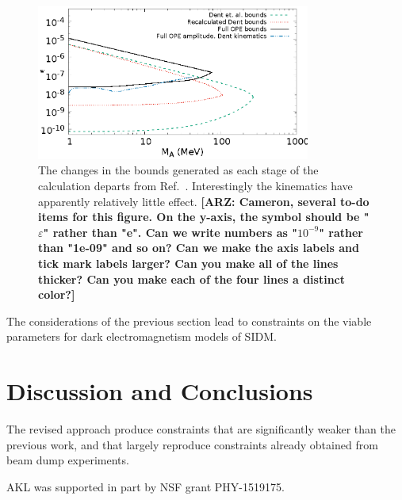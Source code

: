 \documentclass[nofootinbib,prd,superscriptaddress,twocolumn]{revtex4}
\newcommand{\arz}[1]{{{\bf{\color{BrickRed}[ARZ: #1]}}}}
\begin{document}
\begin{figure}[th]
\includegraphics[width=9cm]{stages.eps}
\caption{The changes in the bounds generated as each stage of the calculation departs from Ref.~\cite{dent_etal12}. Interestingly the kinematics have apparently relatively little effect.
\arz{Cameron, several to-do items for this figure. On the y-axis, the symbol should be "$\varepsilon$" rather than 
"e". Can we write numbers as "$10^{-9}$" rather than "1e-09" and so on? Can we make the axis labels and 
tick mark labels larger? Can you make all of the lines thicker? Can you make each of the four lines a distinct color?}
}
\end{figure}

The considerations of the previous section lead to constraints on the 
viable parameters for dark electromagnetism models of SIDM. 



\section{Discussion and Conclusions}
\label{section:conclusions}


	The revised approach produce constraints that are significantly weaker than the previous work, and that largely reproduce constraints already obtained from beam dump experiments. 




\acknowledgments

AKL was supported in part by NSF grant PHY-1519175.



\end{document}
